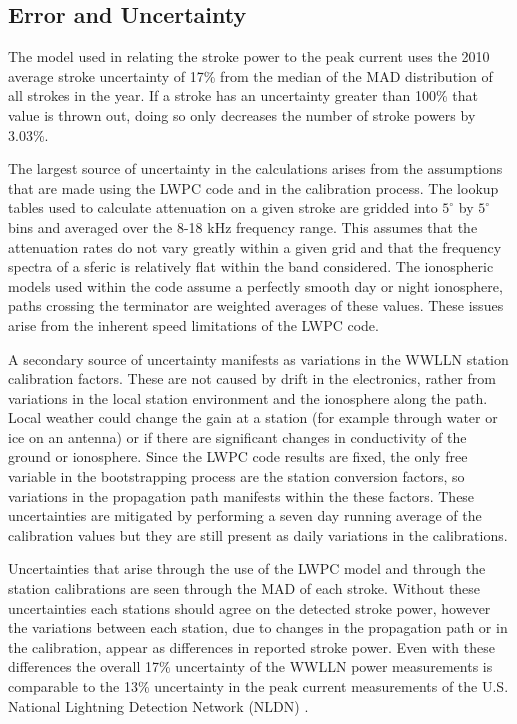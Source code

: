 \documentclass[12pt]{article}
\begin{document}
\subsection{Error and Uncertainty}

The model used in relating the stroke power to the peak current uses the 2010 average stroke uncertainty of 17\% from the median of the MAD distribution of all strokes in the year. If a stroke has an uncertainty greater than 100\% that value is thrown out, doing so only decreases the number of stroke powers by 3.03\%.

The largest source of uncertainty in the calculations arises from the assumptions that are made using the LWPC code and in the calibration process. The lookup tables used to calculate attenuation on a given stroke are gridded into $5^{\circ}$ by $5^{\circ}$ bins and averaged over the 8-18 kHz frequency range. This assumes that the attenuation rates do not vary greatly within a given grid and that the frequency spectra of a sferic is relatively flat within the band considered. The ionospheric models used within the code assume a perfectly smooth day or night ionosphere, paths crossing the terminator are weighted averages of these values. These issues arise from the inherent speed limitations of the LWPC code.

A secondary source of uncertainty manifests as variations in the WWLLN station calibration factors. These are not caused by drift in the electronics, rather from variations in the local station environment and the ionosphere along the path. Local weather could change the gain at a station (for example through water or ice on an antenna) or if there are significant changes in conductivity of the ground or ionosphere. Since the LWPC code results are fixed, the only free variable in the bootstrapping process are the station conversion factors, so variations in the propagation path manifests within the these factors. These uncertainties are mitigated by performing a seven day running average of the calibration values but they are still present as daily variations in the calibrations.

Uncertainties that arise through the use of the LWPC model and through the station calibrations are seen through the MAD of each stroke. Without these uncertainties each stations should agree on the detected stroke power, however the variations between each station, due to changes in the propagation path or in the calibration, appear as differences in reported stroke power. Even with these differences the overall 17\% uncertainty of the WWLLN power measurements is comparable to the 13\% uncertainty in the peak current measurements of the U.S. National Lightning Detection Network (NLDN) \citep{Nag2011}.
\end{document}
